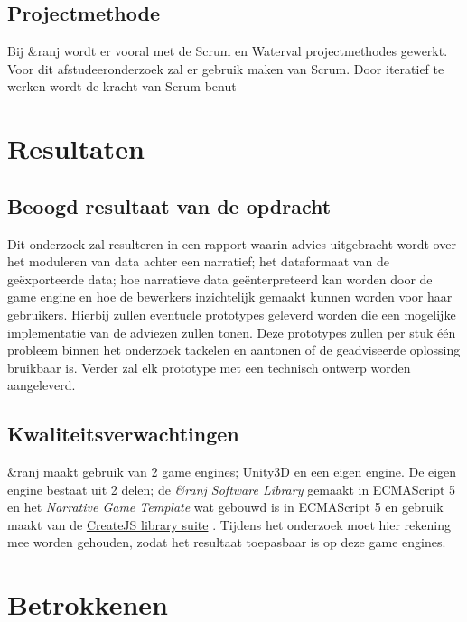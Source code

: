 \documentclass{report}
\newcommand{\organisation}{\&ranj}
\begin{document}
\section{Projectmethode}
Bij \organisation{} wordt er vooral met de Scrum en Waterval projectmethodes gewerkt. Voor dit afstudeeronderzoek zal er gebruik maken van Scrum. Door iteratief te werken wordt de kracht van Scrum benut


\chapter{Resultaten}

\section{Beoogd resultaat van de opdracht}
Dit onderzoek zal resulteren in een rapport waarin advies uitgebracht wordt over het moduleren van data achter een narratief; het dataformaat van de ge{\"e}xporteerde data; hoe narratieve data ge{\"e}nterpreteerd kan worden door de game engine en hoe de bewerkers inzichtelijk gemaakt kunnen worden voor haar gebruikers. Hierbij zullen eventuele prototypes geleverd worden die een mogelijke implementatie van de adviezen zullen tonen. Deze prototypes zullen per stuk {\'e}{\'e}n probleem binnen het onderzoek tackelen en aantonen of de geadviseerde oplossing bruikbaar is. Verder zal elk prototype met een technisch ontwerp worden aangeleverd.

\section{Kwaliteitsverwachtingen}
\organisation{} maakt gebruik van 2 game engines; Unity3D en een eigen engine. De eigen engine bestaat uit 2 delen; de \emph{\organisation{} Software Library} gemaakt in ECMAScript 5 en het \emph{Narrative Game Template} wat gebouwd is in ECMAScript 5 en gebruik maakt van de \href{https://createjs.com/}{CreateJS library suite} \cite{interviewivo}. Tijdens het onderzoek moet hier rekening mee worden gehouden, zodat het resultaat toepasbaar is op deze game engines.


\renewcommand{\bibname}{Referenties}

\nocite{*}

\chapter{Betrokkenen}
\end{document}
